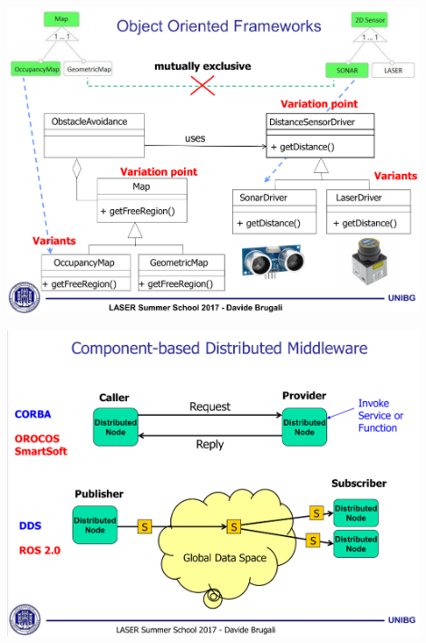 \documentclass[xetex,mathserif,serif]{beamer}
\begin{document}
	\begin{frame}
		\begin{center}
			\includegraphics[width=0.9\textwidth]{brugali14.png}
		\end{center}
	\end{frame}

	\begin{frame}
		\begin{center}
			\includegraphics[width=0.9\textwidth]{brugali15.png}
		\end{center}
	\end{frame}
\end{document}
